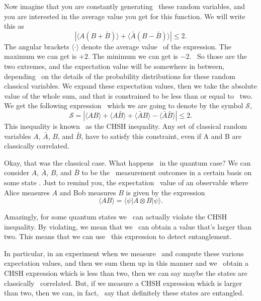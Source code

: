 Now imagine that you are constantly generating 
these random variables, and you are
interested in the average value you get for this function.
We will write this as
\begin{equation}
|\langle A(B+\bar{B})\rangle+\langle\bar{A}(B-\bar{B})\rangle| \leq 2.
\end{equation}
The angular brackets $\langle\cdot\rangle$ denote the average value 
of the expression. The maximum we can
get is $+2$. The minimum we can get is $-2$. 
So those are the two extremes, and the expectation
value will be somewhere in between, depending 
on the details of the probability distributions
for these random classical variables. We expand these expectation values, then we take the absolute value of the whole sum,
and that is constrained to be less than or equal to 
two.
We get the following expression 
which we are going to denote by the symbol $\mathcal{S}$,
\begin{equation}
\mathcal{S}=|\langle A B\rangle+\langle A \bar{B}\rangle+\langle\bar{A} B\rangle-\langle\bar{A} \bar{B}\rangle| \leq 2.
\label{eq:chsh-inequality}
\end{equation}
This inequality is known 
as the CHSH inequality.
Any set of classical random variables $A$,
$\bar{A}$, $B$, and $\bar{B}$, have to satisfy this constraint, even if A and B are classically correlated.

Okay, that was the classical case. What happens 
in the quantum case? We can consider $A$,
$\bar{A}$, $B$, and $\bar{B}$ to be the 
measurement outcomes in a certain basis on some
state \ket{\psi}. Just to remind you, the expectation 
value of an observable where Alice measures $A$ and
Bob measures $B$ is given by the expression
\begin{equation}
\langle A B\rangle=\langle\psi|A \otimes B| \psi\rangle.
\end{equation}

Amazingly, for some quantum states we 
can actually violate the CHSH inequality.
By violating, we mean that we 
can obtain a value that's larger than two.
This means that we can use 
this expression to detect entanglement.

In particular, in an experiment when we measure 
and compute these various expectation values,
and then we sum them up in this manner and we 
obtain a CHSH expression which is less than two,
then we can say maybe the states are classically 
correlated. But, if we measure a CHSH expression
which is larger than two, then we can, in fact, 
say that definitely these states are entangled.

